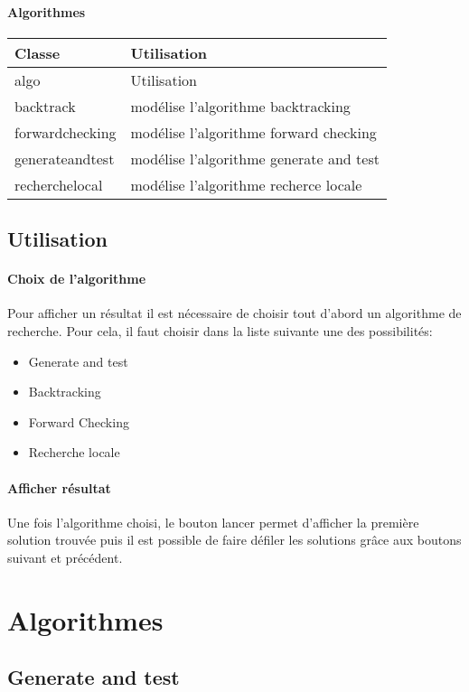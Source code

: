 \documentclass[a4paper,12pt]{report}
\begin{document}
		\subsubsection{Algorithmes}
			\begin{tabular}{|l|l|}
				\hline
				Classe & Utilisation \\
				\hline
				algo & Utilisation \\
				backtrack & modélise l'algorithme backtracking\\
				forwardchecking & modélise l'algorithme forward checking\\
				generateandtest & modélise l'algorithme generate and test\\
				recherchelocal & modélise l'algorithme recherce locale \\
				
				\hline
			\end{tabular}

	\section{Utilisation}
		\subsubsection{Choix de l'algorithme}
		Pour afficher un résultat il est nécessaire de choisir tout d'abord un algorithme de recherche. Pour cela, il faut choisir dans la liste suivante une des possibilités:
\begin{itemize}
  \item Generate and test
  \item Backtracking
  \item Forward Checking
  \item Recherche locale
\end{itemize}
		\subsubsection{Afficher résultat}
		Une fois l'algorithme choisi, le bouton lancer permet d'afficher la première solution trouvée puis il est possible de faire défiler les solutions grâce aux boutons suivant et précédent. 

\chapter{Algorithmes}
	\section{Generate and test}
\end{document}

